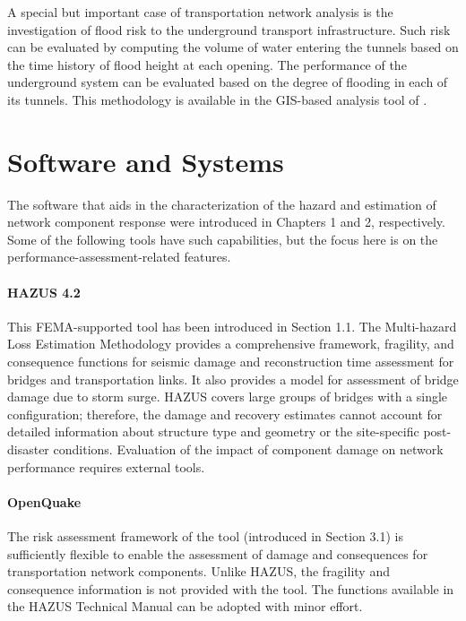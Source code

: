 A special but important case of transportation network analysis is the investigation of flood risk to the underground transport infrastructure. Such risk can be evaluated by computing the volume of water entering the tunnels based on the time history of flood height at each opening. The performance of the underground system can be evaluated based on the degree of flooding in each of its tunnels. This methodology is available in the GIS-based analysis tool of \cite{jacob2011responding}.

\section{Software and Systems}
\label{sec:perf_transport_tools}

The software that aids in the characterization of the hazard and estimation of network component response were introduced in Chapters 1 and 2, respectively. Some of the following tools have such capabilities, but the focus here is on the performance-assessment-related features.

\paragraph{HAZUS 4.2} This FEMA-supported tool has been introduced in Section 1.1. The  Multi-hazard Loss Estimation Methodology provides a comprehensive framework, fragility, and consequence functions for seismic damage and reconstruction time assessment for bridges and transportation links. It also provides a model for assessment of bridge damage due to storm surge. HAZUS covers large groups of bridges with a single configuration; therefore, the damage and recovery estimates cannot account for detailed information about structure type and geometry or the site-specific post-disaster conditions. Evaluation of the impact of component damage on network performance requires external tools.

\paragraph{OpenQuake} The risk assessment framework of the  tool (introduced in Section 3.1) is sufficiently flexible to enable the assessment of damage and consequences for transportation network components. Unlike HAZUS, the fragility and consequence information is not provided with the tool. The functions available in the HAZUS Technical Manual \citep{fema2020earthquaketechnical} can be adopted with minor effort.

